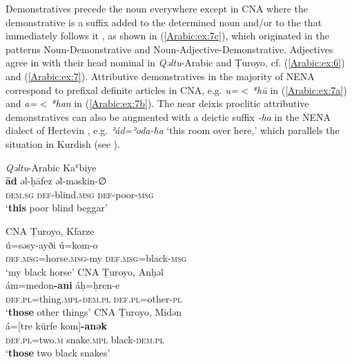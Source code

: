 \documentclass[output=paper,colorlinks,citecolor=brown,draftmode]{langscibook}
\begin{document}
\begin{sloppypar}
Demonstratives precede the noun everywhere except in CNA where the demonstrative is a suffix added to the determined noun and/or to the  that immediately follows it \citep[46--47]{Waltisberg2016STuroyo}, as shown in (\ref{Arabic:ex:7c}), which originated in the patterns Noun-Demonstrative and Noun-Adjective-Demonstrative.  Adjectives agree in  with their head nominal in \textit{Qəltu}-Arabic and Ṭuroyo, cf. (\ref{Arabic:ex:6}) and (\ref{Arabic:ex:7}). Attributive demonstratives in the majority of NENA correspond to prefixal definite articles in CNA, e.g. \textit{u=} < \textit{*hū} in (\ref{Arabic:ex:7a}) and \textit{a=} < \textit{*han} in (\ref{Arabic:ex:7b}). The near deixis proclitic attributive demonstratives can also be augmented with a deictic suffix \textit{-ha} in the NENA dialect of Hertevin \citep[33–34]{Jastrow1988NAHertevin}, e.g. \textit{ʾád=ʾoda-ha} `this room over here,' which parallels the situation in Kurdish (see ).
\end{sloppypar}

\ea\label{Arabic:ex:6}
\textit{Qəltu}-Arabic Kaʿbiye \citep[XXI:§7]{Jastrow2022CADiyarbakir}\\
\gll \textbf{ād} əl-ḥāfez əl-məskin-∅ \\
     \textsc{dem.sg} \textsc{def-}blind\textsc{.msg} \textsc{def-}poor\textsc{-msg} \\
\glt `\textbf{this} poor blind beggar'
\z

\ea\label{Arabic:ex:7}
\ea\label{Arabic:ex:7a}
CNA Ṭuroyo, Kfarze \citep[67:§92]{Ritter1967Turoyo}\\
\gll ú=səsy-ayði ú=kom-o \\
     \textsc{def.msg=}horse\textsc{.msg}-my \textsc{def.msg}=black\textsc{-msg} \\
\glt `my black horse' 
\ex\label{Arabic:ex:7b}
CNA Ṭuroyo, Anḥəl \citep[58:§119]{Ritter1967Turoyo}\\
\gll ám=medon\textbf{-ani} áḥ=ḥren-e \\
     \textsc{def.pl=}thing\textsc{.mpl}-\textsc{dem.pl} \textsc{def.pl=}other\textsc{-pl} \\
\glt `\textbf{those} other things' 
\ex\label{Arabic:ex:7c}
CNA Ṭuroyo, Midən \citep[266.§9]{Jastrow1985Laut}\\
\gll á=\textup{[}tre kŭrfe kom\textup{]}\textbf{-anək} \\
     \textsc{def.pl=}two\textsc{.m} snake\textsc{.mpl} black\textsc{-dem.pl} \\
\glt `\textbf{those} two black snakes' 
\z
\z
\end{document}
